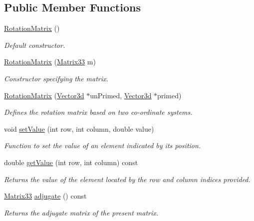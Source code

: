 \subsection*{Public Member Functions}
\begin{DoxyCompactItemize}
\item 
\hyperlink{classRotationMatrix_a4678658c45a6b89f2d06c48b318e2769}{Rotation\-Matrix} ()
\begin{DoxyCompactList}\small\item\em Default constructor. \end{DoxyCompactList}\item 
\hyperlink{classRotationMatrix_a234bf349cf56fc8561a41f5a3669675b}{Rotation\-Matrix} (\hyperlink{classMatrix33}{Matrix33} m)
\begin{DoxyCompactList}\small\item\em Constructor specifying the matrix. \end{DoxyCompactList}\item 
\hyperlink{classRotationMatrix_aa5506a5341c05e42d258a93137635a9b}{Rotation\-Matrix} (\hyperlink{classVector3d}{Vector3d} $\ast$un\-Primed, \hyperlink{classVector3d}{Vector3d} $\ast$primed)
\begin{DoxyCompactList}\small\item\em Defines the rotation matrix based on two co-\/ordinate systems. \end{DoxyCompactList}\item 
void \hyperlink{classMatrix33_a6cdcec77fd089b2e73ad7ae85ecff30b}{set\-Value} (int row, int column, double value)
\begin{DoxyCompactList}\small\item\em Function to set the value of an element indicated by its position. \end{DoxyCompactList}\item 
double \hyperlink{classMatrix33_ab53b3e37ad830a87a804cf26311ba088}{get\-Value} (int row, int column) const 
\begin{DoxyCompactList}\small\item\em Returns the value of the element located by the row and column indices provided. \end{DoxyCompactList}\item 
\hyperlink{classMatrix33}{Matrix33} \hyperlink{classMatrix33_a07b999a7b1c905f3c98ba3792e6fa33f}{adjugate} () const 
\begin{DoxyCompactList}\small\item\em Returns the adjugate matrix of the present matrix. \end{DoxyCompactList}\item 

\end{DoxyCompactItemize}
